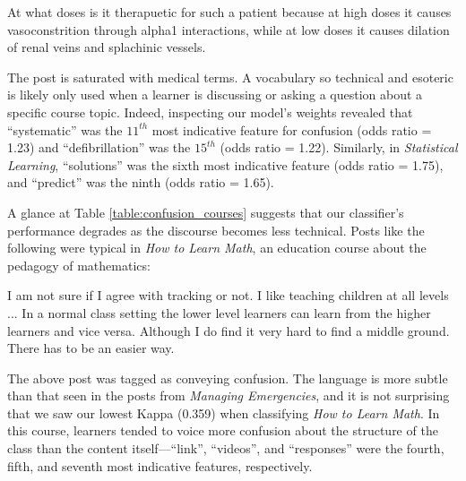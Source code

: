 \documentclass{edm_template}
\begin{document}
\vspace{-10pt}
\begin{displayquote}
At what doses is it therapuetic for such a patient because at high doses it causes vasoconstrition through alpha1 interactions, while at low doses it causes dilation of renal veins and splachinic vessels.
\end{displayquote}
\vspace{-10pt}

The post is saturated with medical terms. A vocabulary so technical and esoteric is likely only used when a learner is discussing or asking a question about a specific course topic. Indeed, inspecting our model's weights revealed that ``systematic'' was the $11^{th}$ most indicative feature for confusion (odds ratio = 1.23) and ``defibrillation'' was the $15^{th}$ (odds ratio = 1.22). Similarly, in \emph{Statistical Learning}, ``solutions'' was the sixth most indicative feature (odds ratio = 1.75), and ``predict'' was the ninth (odds ratio = 1.65).

A glance at Table \ref{table:confusion_courses} suggests that our classifier's performance degrades as the discourse becomes less technical. Posts like the following were typical in \emph{How to Learn Math}, an education course about the pedagogy of mathematics:

\vspace{-10pt}
\begin{displayquote}
I am not sure if I agree with tracking or not.  I like teaching children at all levels ...  In a normal class setting the lower level learners can learn from the higher learners and vice versa.  Although I do find it very hard to find a middle ground. There has to be an easier way.
\vspace{-10pt}
\end{displayquote}

The above post was tagged as conveying confusion. The language is more subtle than that seen in the posts from \emph{Managing Emergencies}, and it is not surprising that we saw our lowest Kappa (0.359) when classifying \emph{How to Learn Math}. In this course, learners tended to voice more confusion about the structure of the class than the content itself---``link'', ``videos'', and ``responses'' were the fourth, fifth, and seventh most indicative features, respectively.
\end{document}
